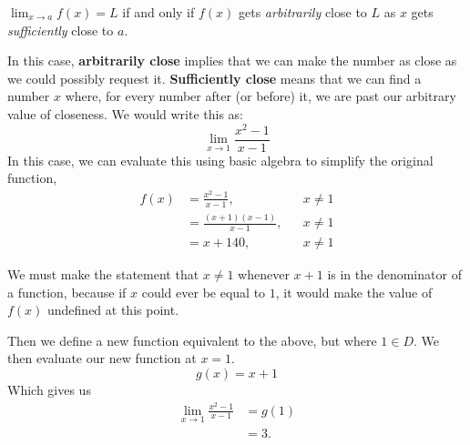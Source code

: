 \begin{defn}\label{defn:limit}
  \( \lim_{x \to a} f(x) = L \) if and only if \(f(x)\) gets \emph{arbitrarily} close to \( L \) as \(x\) gets \emph{sufficiently} close to \(a\).
\end{defn}
  In this case, \textbf{arbitrarily close} implies that we can make the number as close as we could possibly request it. \textbf{Sufficiently close} means that we can find a number $x$ where, for every number after (or before) it, we are past our arbitrary value of closeness.
We would write this as:
\[ \lim_{x \to 1} \frac{x^2-1}{x-1} \]
In this case, we can evaluate this using basic algebra to simplify the original function,
\begin{align*}
   f(x)&=\frac{x^2-1}{x-1},     && x \neq 1 \\
   &=\frac{(x+1)(x-1)}{x-1},    && x \neq 1 \\
   &=x+140,                     && x \neq 1
\end{align*}
\begin{remark}
  We must make the statement that $x \neq 1$ whenever $x+1$ is in the denominator of a function,
  because if $x$ could ever be equal to $1$, it would make the value of $f(x)$ undefined at this point.
\end{remark}
Then we define a new function equivalent to the above, but where \(1 \in D\).
We then evaluate our new function at \(x=1\).
\[ g(x) = x+1 \]
Which gives us
\begin{align*}
  \lim_{x \to 1} \frac{x^2-1}{x-1}
  &=g(1)
  \\&=3.
\end{align*}

